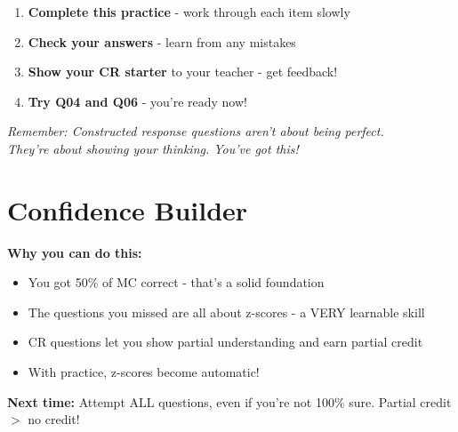\documentclass[11pt]{article}
\begin{document}
\begin{enumerate}
    \item \textbf{Complete this practice} - work through each item slowly
    \item \textbf{Check your answers} - learn from any mistakes
    \item \textbf{Show your CR starter} to your teacher - get feedback!
    \item \textbf{Try Q04 and Q06} - you're ready now!
\end{enumerate}

\vspace{0.15in}

\begin{center}
\textit{Remember: Constructed response questions aren't about being perfect.}\\
\textit{They're about showing your thinking. You've got this!}
\end{center}

\vspace{0.2in}

\section*{Confidence Builder}

\textbf{Why you can do this:}
\begin{itemize}
    \item You got 50\% of MC correct - that's a solid foundation
    \item The questions you missed are all about z-scores - a VERY learnable skill
    \item CR questions let you show partial understanding and earn partial credit
    \item With practice, z-scores become automatic!
\end{itemize}

\textbf{Next time:} Attempt ALL questions, even if you're not 100\% sure. Partial credit $>$ no credit!
\end{document}
